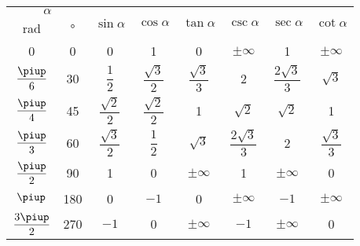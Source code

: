 \begin{center}
    \label{taula:func-trig-angles}
   \begin{tabular}{cccccccc}
   \toprule[1pt]
    \multicolumn{2}{c}{$\alpha$} &
    \multirow{2}{15mm}{\hspace{2ex}\rule{0mm}{6mm}$\sin\alpha$} &
    \multirow{2}{15mm}{\hspace{2ex}\rule{0mm}{6mm}$\cos\alpha$}  &
    \multirow{2}{15mm}{\hspace{2ex}\rule{0mm}{6mm}$\tan\alpha$} &
    \multirow{2}{15mm}{\hspace{2ex}\rule{0mm}{6mm}$\csc\alpha$} &
    \multirow{2}{15mm}{\hspace{2ex}\rule{0mm}{6mm}$\sec\alpha$}  &
    \multirow{2}{15mm}{\hspace{2ex}\rule{0mm}{6mm}$\cot\alpha$}\\
    \cmidrule(rl){1-2}
    rad & \si{\degree} & & & & & & \\
   \midrule
   0 & 0 & 0 & 1 & 0 & $\pm\infty$ & 1 & $\pm\infty$\\[1ex]
   $\dfrac{\piup}{6}$ & 30 & $\dfrac{1}{2}$ & $\dfrac{\sqrt{3}}{2}$ &
   $\dfrac{\sqrt{3}}{3}$ & 2 & $\dfrac{2\sqrt{3}}{3}$ & $\sqrt{3}$\\[1.5ex]
   $\dfrac{\piup}{4}$ & 45 & $\dfrac{\sqrt{2}}{2}$  &
   $\dfrac{\sqrt{2}}{2}$ & 1 & $\sqrt{2}$ & $\sqrt{2}$ & 1\\[1.5ex]
   $\dfrac{\piup}{3}$ & 60 &  $\dfrac{\sqrt{3}}{2}$ & $\dfrac{1}{2}$ &
   $\sqrt{3}$ & $\dfrac{2\sqrt{3}}{3}$ & 2 & $\dfrac{\sqrt{3}}{3}$\\[2ex]
   $\dfrac{\piup}{2}$ & 90 & 1 & 0 & $\pm\infty$ & 1 & $\pm\infty$ & 0\\[1.5ex]
   $\piup$ & 180 & 0 & $-1$ & 0 & $\pm\infty$ & $-1$ & $\pm\infty$\\[1ex]
   $\dfrac{3\piup}{2}$ & 270 & $-1$ & 0 & $\pm\infty$ & $-1$ & $\pm\infty$ & 0\\
   \bottomrule[1pt]
   \end{tabular}
\end{center}

